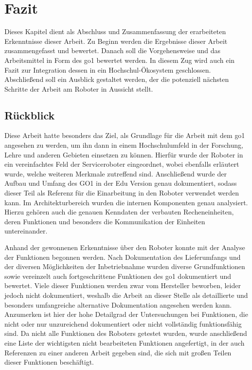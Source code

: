 \clearpage

\section{Fazit}
\label{sec:fazit}

Dieses Kapitel dient als Abschluss und Zusammenfassung der erarbeiteten Erkenntnisse dieser Arbeit.
Zu Beginn werden die Ergebnisse dieser Arbeit zusammengefasst und bewertet.
Danach soll die Vorgehensweise und das Arbeitsmittel in Form des \gls{go1} bewertet werden.
In diesem Zug wird auch ein Fazit zur Integration dessen in ein Hochschul-Ökosystem geschlossen.
Abschließend soll ein Ausblick gestaltet werden, der die potenziell nächsten Schritte der Arbeit am Roboter in Aussicht stellt.

\subsection{Rückblick}
\label{subsec:ruckblick}

Diese Arbeit hatte besonders das Ziel, als Grundlage für die Arbeit mit dem \gls{go1} angesehen zu werden, um ihn dann in einem
Hochschulumfeld in der Forschung, Lehre und anderen Gebieten einsetzen zu können.
Hierfür wurde der Roboter in ein vereinfachtes Feld der Serviceroboter eingeordnet, wobei ebenfalls erläutert wurde, welche weiteren
Merkmale zutreffend sind.
Anschließend wurde der Aufbau und Umfang des GO1 in der Edu Version genau dokumentiert, sodass dieser Teil als Referenz für die
Einarbeitung in den Roboter verwendet werden kann.
Im Architekturbereich wurden die internen Komponenten genau analysiert.
Hierzu gehören auch die genauen Kenndaten der verbauten Recheneinheiten, deren Funktionen und besonders die Kommunikation
der Einheiten untereinander.

Anhand der gewonnenen Erkenntnisse über den Roboter konnte mit der Analyse der Funktionen begonnen werden.
Nach Dokumentation des Lieferumfangs und der diversen Möglichkeiten der Inbetriebnahme wurden diverse Grundfunktionen sowie
vereinzelt auch fortgeschrittene Funktionen des \gls{go1} dokumentiert und bewertet.
Viele dieser Funktionen werden zwar vom Hersteller beworben, leider jedoch nicht dokumentiert, weshalb die Arbeit
an dieser Stelle als detaillierte und besonders umfangreiche alternative Dokumentation angesehen werden kann.
Anzumerken ist hier der hohe Detailgrad der Untersuchungen bei Funktionen, die nicht oder nur unzureichend
dokumentiert oder nicht vollständig funktionsfähig sind.
Da nicht alle Funktionen des Roboters getestet wurden, wurde anschließend eine Liste der wichtigsten nicht bearbeiteten Funktionen
angefertigt, in der auch Referenzen zu einer anderen Arbeit gegeben sind, die sich mit großen Teilen dieser
Funktionen beschäftigt.

